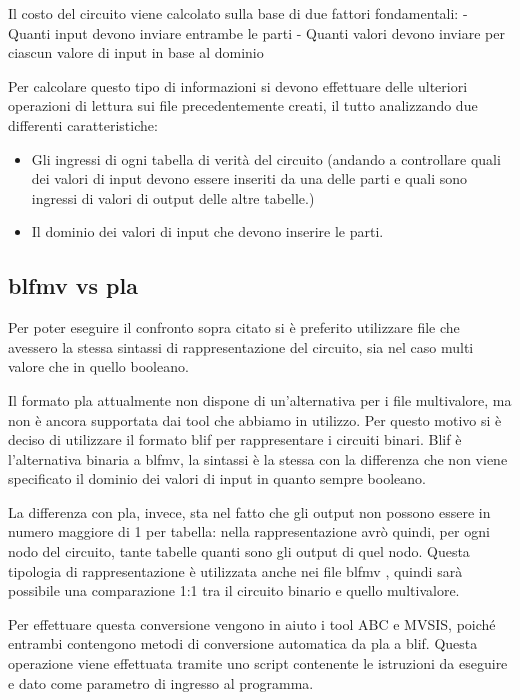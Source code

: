 \documentclass[italian,]{book}
\providecommand{\tightlist}{%
  \setlength{\itemsep}{0pt}\setlength{\parskip}{0pt}}
\begin{document}
Il costo del circuito viene calcolato sulla base di due fattori fondamentali:
- Quanti input devono inviare entrambe le parti
- Quanti valori devono inviare per ciascun valore di input in base al dominio

Per calcolare questo tipo di informazioni si devono effettuare delle ulteriori operazioni di lettura sui file precedentemente creati, il tutto analizzando due differenti caratteristiche:

\begin{itemize}
\tightlist
\item
  Gli ingressi di ogni tabella di verità del circuito (andando a controllare quali dei valori di input devono essere inseriti da una delle parti e quali sono ingressi di valori di output delle altre tabelle.)
\item
  Il dominio dei valori di input che devono inserire le parti.
\end{itemize}

\newpage

\hypertarget{blfmv-vs-pla}{%
\subsection{blfmv vs pla}\label{blfmv-vs-pla}}

Per poter eseguire il confronto sopra citato si è preferito utilizzare file che avessero la stessa sintassi di rappresentazione del circuito, sia nel caso multi valore che in quello booleano.

Il formato pla attualmente non dispone di un'alternativa per i file multivalore, ma non è ancora supportata dai tool che abbiamo in utilizzo. Per questo motivo si è deciso di utilizzare il formato blif per rappresentare i circuiti binari. Blif è l'alternativa binaria a blfmv, la sintassi è la stessa con la differenza che non viene specificato il dominio dei valori di input in quanto sempre booleano.

La differenza con pla, invece, sta nel fatto che gli output non possono essere in numero maggiore di 1 per tabella: nella rappresentazione avrò quindi, per ogni nodo del circuito, tante tabelle quanti sono gli output di quel nodo. Questa tipologia di rappresentazione è utilizzata anche nei file blfmv , quindi sarà possibile una comparazione 1:1 tra il circuito binario e quello multivalore.

Per effettuare questa conversione vengono in aiuto i tool ABC e MVSIS, poiché entrambi contengono metodi di conversione automatica da pla a blif. Questa operazione viene effettuata tramite uno script contenente le istruzioni da eseguire e dato come parametro di ingresso al programma.
\end{document}
